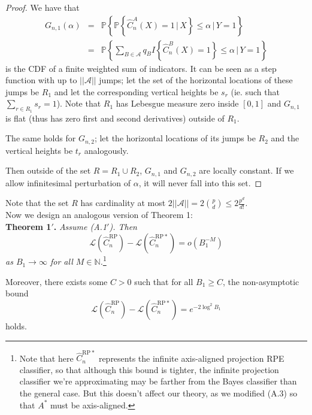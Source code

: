 \documentclass[ejs,preprint]{imsart}
\newcommand\crpnhat{\hat{C}_{n}^{\mathrm{RP}}}
\newcommand\crpnhatstar{\hat{C}_{n}^{\mathrm{RP*}}}
\newcommand\risk{\mathcal{L}}
\begin{document}
\begin{proof}
We have that 
\begin{eqnarray*}
G_{n,1}(\alpha) & = & \mathbb{P}\left\{ \mathbb{P}\left\{ \hat{C}_{n}^{A}(X)=1\,\Big|\,X\right\} \leq\alpha\,\Big|\,Y=1\right\} \\
 & = & \mathbb{P}\left\{ \sum_{B\in\mathcal{A}}q_{B}I\left\{ \hat{C}_{n}^{B}(X)=1\right\} \leq\alpha\,\Big|\,Y=1\right\} 
\end{eqnarray*}
 is the CDF of a finite weighted sum of indicators. It can be seen
as a step function with up to $||\mathcal{A}||$ jumps; let the set of the
horizontal locations of these jumps be $R_{1}$ and let the corresponding
vertical heights be $s_{r}$ (ie. such that $\sum_{r\in R_{1}}s_{r}=1$).
Note that $R_{1}$ has Lebesgue measure zero inside $[0,1]$ and $G_{n,1}$
is flat (thus has zero first and second derivatives) outside of $R_{1}$.

The same holds for $G_{n,2}$; let the horizontal locations of its
jumps be $R_{2}$ and the vertical heights be $t_{r}$ analogously.

Then outside of the set $R=R_{1}\cup R_{2}$, $G_{n,1}$ and $G_{n,2}$ are locally constant. If we allow infinitesimal perturbation of $\alpha$, it will never fall into this set.
\end{proof}


Note that the set $R$ has cardinality at most $2||\mathcal{A}||=2\binom{p}{d}\leq2\frac{p^{d}}{d!}$.\\


Now we design an analogous version of Theorem 1:\\


\noindent \textbf{Theorem 1$'$.} \emph{Assume (A.1$'$). Then 
\[
\risk\left(\crpnhat\right)-\risk\left(\crpnhatstar\right)=o\left(B_{1}^{-M}\right)
\]
 as $B_{1}\to\infty$ for all $M\in\mathbb{N}$.}\footnote{\noindent Note that here $\crpnhatstar$ represents the infinite axis-aligned
projection RPE classifier, so that although this bound is tighter,
the infinite projection classifier we're approximating may be farther
from the Bayes classifier than the general case. But this doesn't affect our theory, as
we modified (A.3) so that $A^{*}$ must be axis-aligned.}

Moreover, there exists some $C>0$ such that for all $B_1\geq C$, the non-asymptotic bound
\[
\risk\left(\crpnhat\right)-\risk\left(\crpnhatstar\right)=e^{-2\log^2 B_1}
\]
holds.
\end{document}
